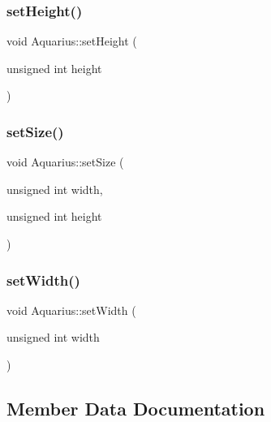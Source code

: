 \subsubsection{\texorpdfstring{set\+Height()}{setHeight()}}
{\footnotesize\ttfamily void Aquarius\+::set\+Height (\begin{DoxyParamCaption}\item[{unsigned int}]{height }\end{DoxyParamCaption})}

\mbox{\label{classAquarius_ac357e8f719c2089527d2c493ca6aa1fc_ac357e8f719c2089527d2c493ca6aa1fc}} 
\subsubsection{\texorpdfstring{set\+Size()}{setSize()}}
{\footnotesize\ttfamily void Aquarius\+::set\+Size (\begin{DoxyParamCaption}\item[{unsigned int}]{width,  }\item[{unsigned int}]{height }\end{DoxyParamCaption})}

\mbox{\label{classAquarius_a129d55d1a9e34354d1173f77f35f5ac8_a129d55d1a9e34354d1173f77f35f5ac8}} 
\subsubsection{\texorpdfstring{set\+Width()}{setWidth()}}
{\footnotesize\ttfamily void Aquarius\+::set\+Width (\begin{DoxyParamCaption}\item[{unsigned int}]{width }\end{DoxyParamCaption})}



\subsection{Member Data Documentation}
\mbox{\label{classAquarius_a3b82543e9c69b03b53c76fbce4f945ea_a3b82543e9c69b03b53c76fbce4f945ea}} 
